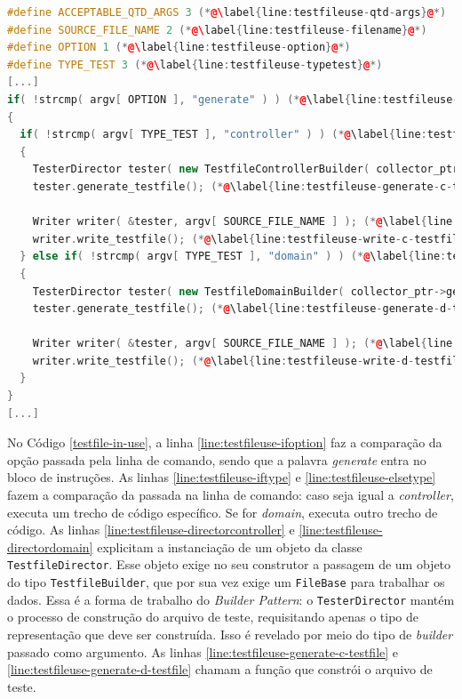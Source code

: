 \begin{lstlisting}[language=C++, label=testfile-in-use, caption=Agente testador sendo usado na função \lstinline|main|]
#define ACCEPTABLE_QTD_ARGS 3 (*@\label{line:testfileuse-qtd-args}@*)
#define SOURCE_FILE_NAME 2 (*@\label{line:testfileuse-filename}@*)
#define OPTION 1 (*@\label{line:testfileuse-option}@*)
#define TYPE_TEST 3 (*@\label{line:testfileuse-typetest}@*)
[...]
if( !strcmp( argv[ OPTION ], "generate" ) ) (*@\label{line:testfileuse-ifoption}@*)
{
  if( !strcmp( argv[ TYPE_TEST ], "controller" ) ) (*@\label{line:testfileuse-iftype}@*)
  {
    TesterDirector tester( new TestfileControllerBuilder( collector_ptr->get_data() ) ); (*@\label{line:testfileuse-directorcontroller}@*)
    tester.generate_testfile(); (*@\label{line:testfileuse-generate-c-testfile}@*)

    Writer writer( &tester, argv[ SOURCE_FILE_NAME ] ); (*@\label{line:testfileuse-writer-c}@*)
    writer.write_testfile(); (*@\label{line:testfileuse-write-c-testfile}@*)
  } else if( !strcmp( argv[ TYPE_TEST ], "domain" ) ) (*@\label{line:testfileuse-elsetype}@*)
  {
    TesterDirector tester( new TestfileDomainBuilder( collector_ptr->get_data() ) ); (*@\label{line:testfileuse-directordomain}@*)
    tester.generate_testfile(); (*@\label{line:testfileuse-generate-d-testfile}@*)

    Writer writer( &tester, argv[ SOURCE_FILE_NAME ] ); (*@\label{line:testfileuse-writer-d}@*)
    writer.write_testfile(); (*@\label{line:testfileuse-write-d-testfile}@*)
  }
}
[...]
\end{lstlisting}

No Código \ref{testfile-in-use}, a linha \ref{line:testfileuse-ifoption}
faz a comparação da opção passada pela linha de comando, sendo que a palavra
\textit{generate} entra no bloco de instruções. As linhas
\ref{line:testfileuse-iftype} e \ref{line:testfileuse-elsetype} fazem a
comparação da \str passada na linha de comando: caso seja igual a
\textit{controller}, executa um trecho de código específico. Se for \textit{domain}, executa outro trecho de código. As linhas \ref{line:testfileuse-directorcontroller} e
\ref{line:testfileuse-directordomain} explicitam a instanciação de um
objeto da classe \lstinline|TestfileDirector|. Esse objeto exige no
seu construtor a passagem de um objeto do tipo \lstinline|TestfileBuilder|,
que por sua vez exige um \lstinline|FileBase| para trabalhar os dados. Essa
é a forma de trabalho do \textit{Builder Pattern}: o \lstinline|TesterDirector|
mantém o processo de construção do arquivo de teste, requisitando apenas o
tipo de representação que deve ser construída. Isso é revelado por meio do
tipo de \textit{builder} passado como argumento. As linhas
\ref{line:testfileuse-generate-c-testfile} e \ref{line:testfileuse-generate-d-testfile}
chamam a função que constrói o arquivo de teste.


